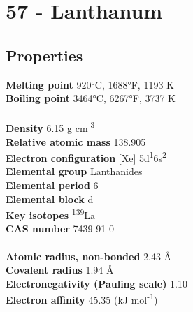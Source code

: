 \section{57 - Lanthanum}
\label{sec:elem-lanthanum}
\subsection{Properties}
\textbf{Melting point} 920°C, 1688°F, 1193 K\\
\textbf{Boiling point} 3464°C, 6267°F, 3737 K\\
\\
\textbf{Density} 6.15 g cm\textsuperscript{-3}\\
\textbf{Relative atomic mass} 138.905\\
\textbf{Electron configuration} [Xe] 5d\textsuperscript{1}6s\textsuperscript{2}\\
\textbf{Elemental group} Lanthanides\\
\textbf{Elemental period} 6\\
\textbf{Elemental block} d\\
\textbf{Key isotopes} \textsuperscript{139}La\\
\textbf{CAS number} 7439-91-0\\
\\
\textbf{Atomic radius, non-bonded} 2.43 Å\\
\textbf{Covalent radius} 1.94 Å\\
\textbf{Electronegativity (Pauling scale)} 1.10\\
\textbf{Electron affinity} 45.35 (kJ mol\textsuperscript{-1})\\
